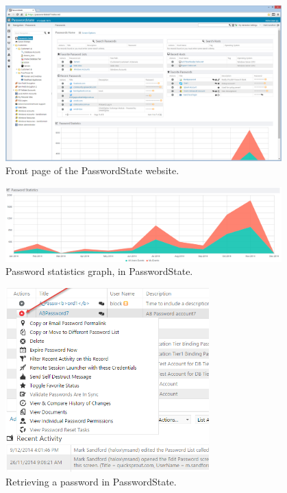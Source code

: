 			\begin{figure}[htbp]
				\centering
				\includegraphics[width=0.95\textwidth]{figures/analysis/passwordstate_main.png}
				\caption{Front page of the PasswordState website.  }
				\label{fig:passwordstate_main}
			\end{figure}

			\begin{figure}[htbp]
				\centering
				\includegraphics[width=0.95\textwidth]{figures/analysis/passwordstate_graph.png}
				\caption{Password statistics graph, in PasswordState. }
				\label{fig:passwordstate_graph}
			\end{figure}

			\begin{figure}[htbp]
				\centering
				\includegraphics[width=0.7\textwidth]{figures/analysis/passwordstate_getpassword.png}
				\caption{Retrieving a password in PasswordState. }
				\label{fig:passwordstate_getpassword}
			\end{figure}

